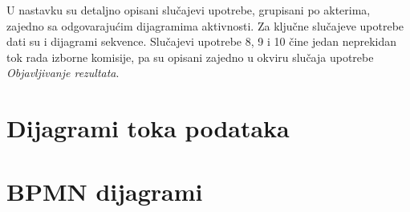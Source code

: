 \documentclass[12pt,a4paper]{article}
\begin{document}
U nastavku su detaljno opisani slučajevi upotrebe, grupisani po akterima, zajedno sa odgovarajućim dijagramima aktivnosti. Za ključne slučajeve upotrebe dati su i dijagrami sekvence. Slučajevi upotrebe 8, 9 i 10 čine jedan neprekidan tok rada izborne komisije, pa su opisani zajedno u okviru slučaja upotrebe \textit{Objavljivanje rezultata}.

\newpage









\section{Dijagrami toka podataka}


\section{BPMN dijagrami}


% 
%
% 
%
% 
%
% 
\end{document}
